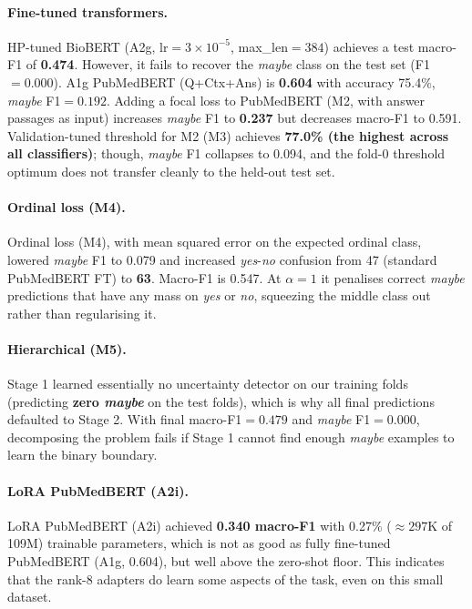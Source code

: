 \documentclass[11pt]{article}
\begin{document}
\paragraph{Fine-tuned transformers.} HP-tuned BioBERT (A2g, lr$={}3{\times}10^{-5}$, max\_len${}={}384$) achieves a test macro-F1 of \textbf{0.474}. However, it fails to recover the \textit{maybe} class on the test set (F1${}={}0.000$). A1g PubMedBERT (Q+Ctx+Ans) is \textbf{0.604} with accuracy 75.4\%, \textit{maybe} F1${}={}0.192$. Adding a focal loss to PubMedBERT (M2, with answer passages as input) increases \textit{maybe} F1 to \textbf{0.237} but decreases macro-F1 to 0.591. Validation-tuned threshold for M2 (M3) achieves \textbf{77.0\% (the highest across all classifiers)}; though, \textit{maybe} F1 collapses to 0.094, and the fold-0 threshold optimum does not transfer cleanly to the held-out test set.

\paragraph{Ordinal loss (M4).} Ordinal loss (M4), with mean squared error on the expected ordinal class, lowered \textit{maybe} F1 to 0.079 and increased \textit{yes}-\textit{no} confusion from 47 (standard PubMedBERT FT) to \textbf{63}. Macro-F1 is 0.547. At $\alpha{=}1$ it penalises correct \textit{maybe} predictions that have any mass on \textit{yes} or \textit{no}, squeezing the middle class out rather than regularising it.

\paragraph{Hierarchical (M5).} Stage 1 learned essentially no uncertainty detector on our training folds (predicting \textbf{zero \textit{maybe}} on the test folds), which is why all final predictions defaulted to Stage 2. With final macro-F1${}={}0.479$ and \textit{maybe} F1${}={}0.000$, decomposing the problem fails if Stage 1 cannot find enough \textit{maybe} examples to learn the binary boundary.

\paragraph{LoRA PubMedBERT (A2i).} LoRA PubMedBERT (A2i) achieved \textbf{0.340 macro-F1} with 0.27\% ($\approx 297$K of 109M) trainable parameters, which is not as good as fully fine-tuned PubMedBERT (A1g, 0.604), but well above the zero-shot floor. This indicates that the rank-8 adapters do learn some aspects of the task, even on this small dataset.
\end{document}
